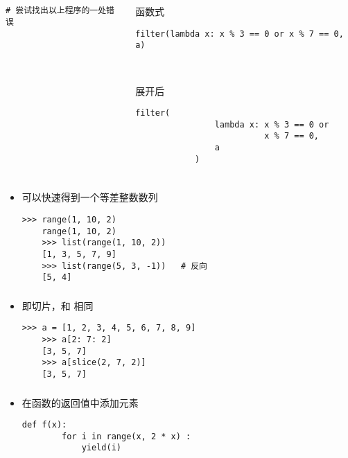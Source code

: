 \begin{CJK}{UTF8}{gbsn}
\begin{frame} [fragile]
\begin{columns}
\begin{column}[T]{.42\textwidth}
\begin{lstlisting}[style=pythonstyle, gobble=12, texcl]
			# 尝试找出以上程序的一处错误
			\end{lstlisting}
		\end{column}
		\begin{column}[T]{.58\textwidth}
			函数式
			\begin{lstlisting}[style=pythonstyle, gobble=12, texcl]
			filter(lambda x: x % 3 == 0 or x % 7 == 0, a)
			\end{lstlisting}

			\

			展开后
			\begin{lstlisting}[style=pythonstyle, gobble=12, texcl]
			filter(
				lambda x: x % 3 == 0 or
						  x % 7 == 0,
				a
			)
			\end{lstlisting}
		\end{column}
	\end{columns}
\end{frame}

\begin{frame} [fragile]
	\frametitle{}
	\linespread{1.25}
	\begin{itemize}
	\item {}可以快速得到一个等差整数数列
	\begin{lstlisting}[style=pythonstyle, gobble=4, texcl]
	>>> range(1, 10, 2)
	range(1, 10, 2)
	>>> list(range(1, 10, 2))
	[1, 3, 5, 7, 9]
	>>> list(range(5, 3, -1))	# 反向
	[5, 4]
	\end{lstlisting}
	\end{itemize}
\end{frame}

\begin{frame} [fragile]
	\frametitle{}
	\linespread{1.25}
	\begin{itemize}
	\item {}即切片，和 \inlinePython{[a:b:c]} 相同
	\begin{lstlisting}[style=pythonstyle, gobble=4, texcl]
	>>> a = [1, 2, 3, 4, 5, 6, 7, 8, 9]
	>>> a[2: 7: 2]
	[3, 5, 7]
	>>> a[slice(2, 7, 2)]
	[3, 5, 7]
	\end{lstlisting}
	\end{itemize}
\end{frame}

\begin{frame} [fragile]
	\frametitle{}
	\begin{itemize}
	\item {}在函数的返回值中添加元素
	\begin{lstlisting}[style=pythonstyle, gobble=4, texcl]
	def f(x):
		for i in range(x, 2 * x) :
			yield(i)


\end{lstlisting}
\end{itemize}
\end{frame}
\end{CJK}
